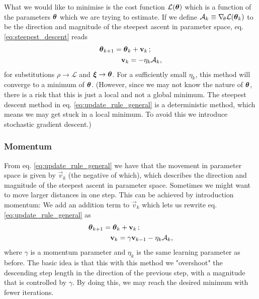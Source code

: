         \fillertext

        What we would like to minimise is the cost function $\mathcal{L}(\boldsymbol{\theta})$ which is a function of the parameters $\boldsymbol{\theta}$ which we are trying to estimate. If we define $\mathcal{A}_k \equiv \nabla_{\!\theta} \mathcal{L}(\boldsymbol{\theta}_k)$ to be the direction and magnitude of the steepest ascent in parameter space, eq. \eqref{eq:steepest_descent} reads 
        \begin{equation}\label{eq:update_rule_general}
            \begin{split}
                \boldsymbol{\theta}_{k+1} &= \boldsymbol{\theta}_k + \mathbf{v}_k\,;  \\
                &\quad \mathbf{v}_k = -\eta_k\mathcal{A}_k,
            \end{split}
        \end{equation}
        for substitutions $\rho\to\mathcal{L}$ and $\boldsymbol{\xi}\to \boldsymbol{\theta}$. For a sufficiently small $\eta_k$, this method will converge to a minimum of $\boldsymbol{\theta}$. (However, since we may not know the nature of $\boldsymbol{\theta}$, there is a risk that this is just a local and not a global minimum. The steepest descent method in eq. \eqref{eq:update_rule_general} is a deterministic method, which means we may get stuck in a local minimum. To avoid this we introduce stochastic gradient descent.) 

    \subsubsection{Momentum}\label{sec:momentum}
        From eq. \eqref{eq:update_rule_general} we have that the movement in parameter space is given by $\vec{v}_k$ (the negative of which), which describes the direction and magnitude of the steepest ascent in parameter space. Sometimes we might want to move larger distances in one step. This can be achieved by introduction momentum: We add an addition term to $\vec{v}_k$ which lets us rewrite eq. \eqref{eq:update_rule_general} as
        \begin{equation}\label{eq:momentum_GD_algorithm}
            \begin{split}
                \boldsymbol{\theta}_{k+1} &= \boldsymbol{\theta}_k + \mathbf{v}_k\, ; \\
                &\quad \mathbf{v}_k =\gamma\mathbf{v}_{k-1} - \eta_k\mathcal{A}_k,
            \end{split}
        \end{equation}
        where $\gamma$ is a momentum parameter and $\eta_k$ is the same learning parameter as before. The basic idea is that this with this method we "overshoot" the descending step length in the direction of the previous step, with a magnitude that is controlled by $\gamma$. By doing this, we may reach the desired minimum with fewer iterations. 

